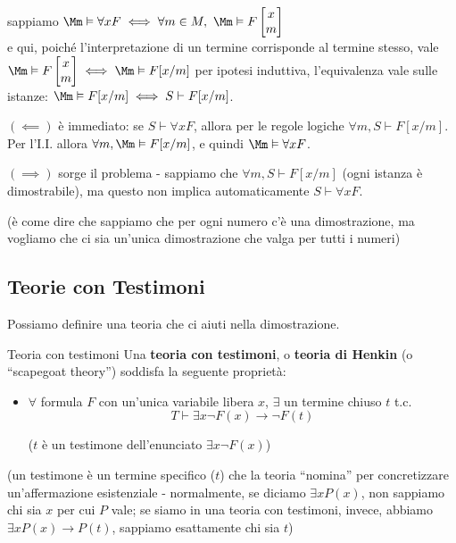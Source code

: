 \documentclass[a4paper,11pt]{report}
\begin{document}
\begin{proofframe}{}
\begin{itemize}
            sappiamo \( \Mm \vDash \forall x F \iff \forall m \in M, \ \Mm \vDash F \tworowmatrix{x}{m} \)\\
        {\color{CadetBlue}e qui, poiché l'interpretazione di un termine corrisponde al termine stesso, vale\\ \( \Mm \vDash F \tworowmatrix{x}{m} \iff \Mm \vDash F[x/m]\)}
        \subitem per ipotesi induttiva, l'equivalenza vale sulle istanze: \( \Mm \vDash F[x/m] \iff S\vdash F[x/m] \).

        \subitem \( (\impliedby) \) è immediato: se \( S \vdash \forall x F \), allora per le regole logiche \( \forall m, S \vdash F[x/m] \). Per l'I.I. allora \( \forall m, \Mm \vDash F[x/m] \), e quindi \( \Mm \vDash \forall x F \).

        \subitem \( (\implies) \) sorge il problema - sappiamo che \( \forall m, S \vdash F[x/m] \) (ogni istanza è dimostrabile), ma questo non implica automaticamente \( S \vdash \forall x F \).
        
        {\color{gray}\small (è come dire che sappiamo che per ogni numero c'è una dimostrazione, ma vogliamo che ci sia un'unica dimostrazione che valga per tutti i numeri)}
    \end{itemize}
\end{proofframe}

\subsection{Teorie con Testimoni}
Possiamo definire una teoria che ci aiuti nella dimostrazione.

\begin{defframe}{Teoria con testimoni}{}
    Una \textbf{teoria con testimoni}, o \textbf{teoria di Henkin} (o ``scapegoat theory'')  soddisfa la seguente proprietà:
    \begin{itemize}
        \item \( \forall \) formula \( F \) con un'unica variabile libera \( x \), \( \exists \) un  termine chiuso \( t \) t.c.
            \[ T \vdash \exists x \neg F(x) \to \neg F(t) \]

            \subitem (\( t \) è un testimone dell'enunciato \( \exists x \neg F(x) \))
    \end{itemize}

    {\color{CadetBlue}(un testimone è un termine specifico (\( t \)) che la teoria ``nomina'' per concretizzare un'affermazione esistenziale - normalmente, se diciamo \( \exists x P(x) \), non sappiamo chi sia \( x \) per cui \( P \) vale; se siamo in una teoria con testimoni, invece, abbiamo \( \exists x P(x) \to P(t) \), sappiamo esattamente chi sia \( t \))}
\end{defframe}
\end{document}
